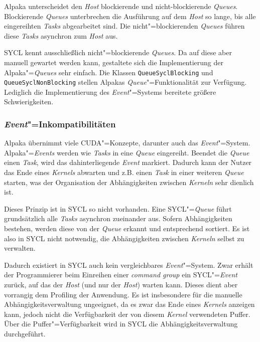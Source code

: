 Alpaka unterscheidet den \textit{Host} blockierende und nicht-blockierende
\textit{Queues}. Blockierende \textit{Queues} unterbrechen die Ausführung auf
dem \textit{Host} so lange, bis alle eingereihten \textit{Tasks} abgearbeitet
sind. Die nicht"=blockierenden \textit{Queues} führen diese \textit{Tasks}
asynchron zum \textit{Host} aus.

SYCL kennt ausschließlich nicht"=blockierende \textit{Queues}. Da auf diese aber
manuell gewartet werden kann, gestaltete sich die Implementierung der
Alpaka"=\textit{Queues} sehr einfach. Die Klassen \texttt{QueueSyclBlocking} und
\texttt{QueueSyclNonBlocking} stellen Alpakas \textit{Queue}"=Funktionalität zur
Verfügung. Lediglich die Implementierung des \textit{Event}"=Systems bereitete
größere Schwierigkeiten.

\subsubsection{\textit{Event}"=Inkompatibilitäten}

Alpaka übernimmt viele CUDA"=Konzepte, darunter auch das \textit{Event}"=System.
Alpaka"=\textit{Events} werden wie \textit{Tasks} in eine \textit{Queue}
eingereiht. Beendet die \textit{Queue} einen \textit{Task}, wird das
dahinterliegende \textit{Event} markiert. Dadurch kann der Nutzer das Ende eines
\textit{Kernels} abwarten und z.B. einen \textit{Task} in einer weiteren
\textit{Queue} starten, was der Organisation der Abhängigkeiten zwischen
\textit{Kerneln} sehr dienlich ist.

Dieses Prinzip ist in SYCL so nicht vorhanden. Eine SYCL"=\textit{Queue} führt
grundsätzlich alle \textit{Tasks} asynchron zueinander aus. Sofern Abhängigkeiten
bestehen, werden diese von der \textit{Queue} erkannt und entsprechend sortiert. Es ist
also in SYCL nicht notwendig, die Abhängigkeiten zwischen \textit{Kerneln}
selbst zu verwalten.

Dadurch existiert in SYCL auch kein vergleichbares \textit{Event}"=System. Zwar
erhält der Programmierer beim Einreihen einer \textit{command group} ein
SYCL"=\textit{Event} zurück, auf das der \textit{Host} (und nur der
\textit{Host}) warten kann. Dieses dient aber vorrangig dem Profiling der
Anwendung. Es ist insbesondere für die manuelle Abhängigkeitsverwaltung
ungeeignet, da es zwar das Ende eines \textit{Kernels} anzeigen kann, jedoch
nicht die Verfügbarkeit der von diesem \textit{Kernel} verwendeten Puffer. Über
die Puffer"=Verfügbarkeit wird in SYCL die Abhängigkeitsverwaltung durchgeführt.

